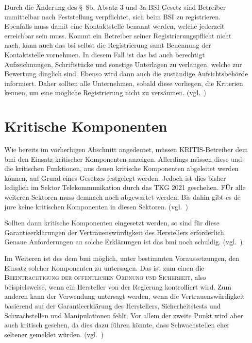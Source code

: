 Durch die Änderung des §~8b, Absatz 3 und 3a BSI-Gesetz sind Betreiber unmittelbar nach Feststellung verpflichtet,
sich beim BSI zu registrieren.
Ebenfalls muss damit eine Kontaktstelle benannt werden, welche jederzeit erreichbar sein muss.
Kommt ein Betreiber seiner Registrierungspflicht nicht nach,
kann auch das \acrshort{bsi} selbst die Registrierung samt Benennung der Kontaktstelle vornehmen.
In diesem Fall ist das \acrshort{bsi} auch berechtigt Aufzeichnungen, Schriftstücke und sonstige Unterlagen zu verlangen,
welche zur Bewertung dinglich sind.
Ebenso wird dann auch die zuständige Aufsichtsbehörde informiert.
Daher sollten alle Unternehmen, sobald diese vorliegen, die Kriterien kennen,
um eine mögliche Registrierung nicht zu versäumen.
(vgl.~\cite{neue-it-sig-2.0})

\section{Kritische Komponenten}\label{sec:kritische-komponenten}
Wie bereits im vorherhigen Abschnitt angedeutet,
müssen KRITIS-Betreiber dem \acrshort{bmi} den Einsatz kritischer Komponenten anzeigen.
Allerdings müssen diese und die kritischen Funktionen, aus denen kritische Komponenten abgeleitet werden können,
auf Grund eines Gesetzes festgelegt werden.
Jedoch ist dies bisher lediglich im Sektor Telekommunikation durch das TKG 2021 geschehen.
FÜr alle weiteren Sektoren muss demnach noch abgewartet werden.
Bis dahin gibt es de jure keine kritischen Komponenten in diesen Sektoren.
(vgl.~\cite{neue-it-sig-2.0})

Sollten dann kritische Komponenten eingesetzt werden,
so sind für diese Garantieerklärungen der Vertrauenswürdigkeit des Herstellers erforderlich.
Genaue Anforderungen an solche Erklärungen ist das \acrshort{bmi} noch schuldig.
(vgl.~\cite{neue-it-sig-2.0})

Im Weiteren ist des dem \acrshort{bmi} möglich, unter bestimmten Voraussetzungen,
den Einsatz solcher Komponenten zu untersagen.
Das ist zum einen die \textsc{Beeinträchtigung der öffentlichen Ordnung und Sicherheit},
also beispielsweise, wenn ein Hersteller von der Regierung kontrolliert wird.
Zum anderen kann der Verwendung untersagt werden,
wenn die Vertrauenswürdigkeit basierend auf der Garantieerklärung des Herstellers,
Sicherheitstests und Schwachstellen und Manipulationen fehlt.
Vor allem der zweite Punkt wird aber auch kritisch gesehen, da dies dazu führen könnte,
dass Schwachstellen eher seltener gemeldet würden.
(vgl.~\cite{neue-it-sig-2.0})

